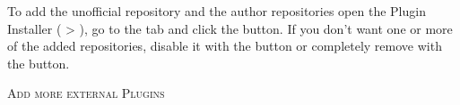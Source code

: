 To add the unofficial repository and the author repositories open the 
Plugin Installer ( > ),
go to the  tab and click the 
button. If you don't want one or more of the added repositories, disable it with the
 button or completely remove with the  button.

\begin{Tip} \caption{\textsc{Add more external Plugins}}
\end{Tip}


